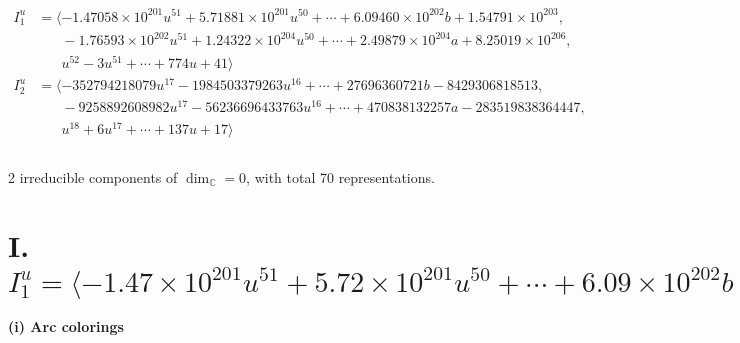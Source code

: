 \documentclass[1p]{elsarticle_modified}
\theoremstyle{definition}
\begin{document}
\begin{align*}
I^u_{1}&=\langle 
-1.47058\times10^{201} u^{51}+5.71881\times10^{201} u^{50}+\cdots+6.09460\times10^{202} b+1.54791\times10^{203},\\
\phantom{I^u_{1}}&\phantom{= \langle  }-1.76593\times10^{202} u^{51}+1.24322\times10^{204} u^{50}+\cdots+2.49879\times10^{204} a+8.25019\times10^{206},\\
\phantom{I^u_{1}}&\phantom{= \langle  }u^{52}-3 u^{51}+\cdots+774 u+41\rangle \\
I^u_{2}&=\langle 
-352794218079 u^{17}-1984503379263 u^{16}+\cdots+27696360721 b-8429306818513,\\
\phantom{I^u_{2}}&\phantom{= \langle  }-9258892608982 u^{17}-56236696433763 u^{16}+\cdots+470838132257 a-283519838364447,\\
\phantom{I^u_{2}}&\phantom{= \langle  }u^{18}+6 u^{17}+\cdots+137 u+17\rangle \\
\\
\end{align*}
\raggedright * 2 irreducible components of $\dim_{\mathbb{C}}=0$, with total 70 representations.\\
\newpage
\renewcommand{\arraystretch}{1}
\centering \section*{I. $I^u_{1}= \langle -1.47\times10^{201} u^{51}+5.72\times10^{201} u^{50}+\cdots+6.09\times10^{202} b+1.55\times10^{203},\;-1.77\times10^{202} u^{51}+1.24\times10^{204} u^{50}+\cdots+2.50\times10^{204} a+8.25\times10^{206},\;u^{52}-3 u^{51}+\cdots+774 u+41 \rangle$}
\flushleft \textbf{(i) Arc colorings}\\
\end{document}
